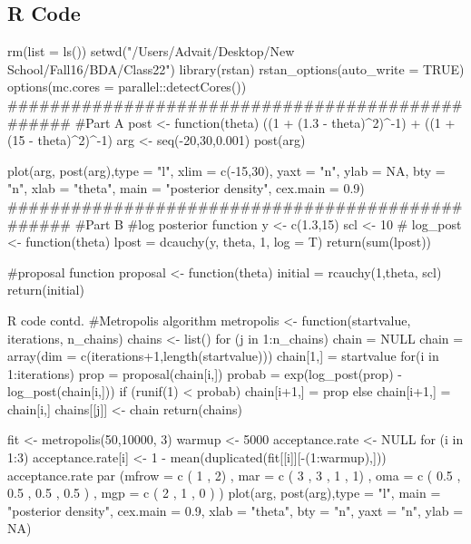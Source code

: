 \documentclass{article}
\begin{document}
\subsection{R Code}
\begin{sexylisting}
rm(list = ls())
setwd("/Users/Advait/Desktop/New School/Fall16/BDA/Class22")
library(rstan)
rstan_options(auto_write = TRUE)
options(mc.cores = parallel::detectCores())
#################################################
#Part A
post <- function(theta){
  ((1 + (1.3 - theta)^2)^-1) + ((1 + (15 - theta)^2)^-1)
}
arg <- seq(-20,30,0.001)
post(arg)

plot(arg, post(arg),type = "l", xlim = c(-15,30),
     yaxt = "n",
     ylab = NA,
     bty = "n",
     xlab = "theta",
     main = "posterior density",
     cex.main = 0.9)
#################################################
#Part B
#log posterior function
y <- c(1.3,15)
scl <- 10
#
log_post <- function(theta){
  lpost = dcauchy(y, 
                  theta, 
                  1, log = T)
  return(sum(lpost))
}

#proposal function
proposal <- function(theta){
  initial = rcauchy(1,theta, scl)
  return(initial)
}
\end{sexylisting}
\begin{sexylisting}{R code contd.}
#Metropolis algorithm
metropolis <- function(startvalue, iterations, n_chains){
  chains <- list()
  for (j in 1:n_chains){
   chain = NULL
   chain = array(dim = c(iterations+1,length(startvalue)))
   chain[1,] = startvalue
 for(i in 1:iterations){
   prop = proposal(chain[i,])
   probab = exp(log_post(prop) - log_post(chain[i,]))
   if (runif(1) < probab){
     chain[i+1,] = prop
   }else{
     chain[i+1,] = chain[i,]
   }
   chains[[j]] <- chain
   }
  }
 return(chains)
}

fit <- metropolis(50,10000, 3)
warmup <- 5000
acceptance.rate <- NULL
for (i in 1:3){
  acceptance.rate[i] <- 1 - mean(duplicated(fit[[i]][-(1:warmup),]))
}
acceptance.rate
par (mfrow = c ( 1 , 2) ,
     mar = c ( 3 , 3 , 1 , 1) ,
     oma = c ( 0.5 , 0.5 , 0.5 , 0.5 ) ,
     mgp = c ( 2 , 1 , 0 ) )
plot(arg, post(arg),type = "l", 
     main = "posterior density",
     cex.main = 0.9,
     xlab = "theta",
     bty = "n",
     yaxt = "n",
     ylab = NA)
     \end{sexylisting}
\end{document}
